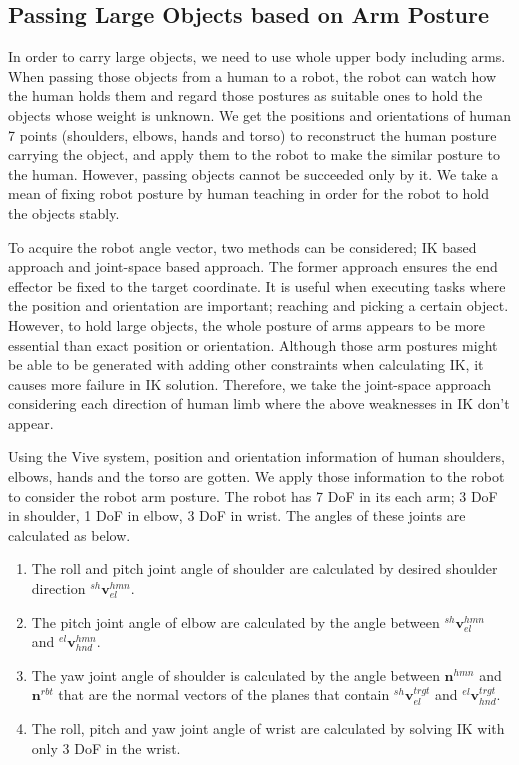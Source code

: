 \subsection{Passing Large Objects based on Arm Posture}
\label{subsec:hold}
In order to carry large objects, we need to use whole upper body including arms. When passing those objects from a human to a robot, the robot can watch how the human holds them and regard those postures as suitable ones to hold the objects whose weight is unknown. We get the positions and orientations of human 7 points (shoulders, elbows, hands and torso) to reconstruct the human posture carrying the object, and apply them to the robot to make the similar posture to the human. However, passing objects cannot be succeeded only by it. We take a mean of fixing robot posture by human teaching in order for the robot to hold the objects stably.\par
To acquire the robot angle vector, two methods can be considered; IK based approach and joint-space based approach. The former approach ensures the end effector be fixed to the target coordinate. It is useful when executing tasks where the position and orientation are important; reaching and picking a certain object. However, to hold large objects, the whole posture of arms appears to be more essential than exact position or orientation. Although those arm postures might be able to be generated with adding other constraints when calculating IK, it causes more failure in IK solution. Therefore, we take the joint-space approach considering each direction of human limb where the above weaknesses in IK don't appear.\par
Using the Vive system, position and orientation information of human shoulders, elbows, hands and the torso are gotten. We apply those information to the robot to consider the robot arm posture. %
The robot has 7 DoF in its each arm; 3 DoF in shoulder, 1 DoF in elbow, 3 DoF in wrist. The angles of these joints are calculated as below.
\begin{enumerate}
 \item The roll and pitch joint angle of shoulder are calculated by desired shoulder direction \(^{sh}\!\bm{v}^{hmn}_{el}\).
 \item The pitch joint angle of elbow are calculated by the angle between \(^{sh}\!\bm{v}^{hmn}_{el}\) and \(^{el}\!\bm{v}^{hmn}_{hnd}\).
 \item The yaw joint angle of shoulder is calculated by the angle between \(\bm{n}^{hmn}\) and \(\bm{n}^{rbt}\) that are the normal vectors of the planes that contain \(^{sh}\!\bm{v}^{trgt}_{el}\) and \(^{el}\!\bm{v}^{trgt}_{hnd}\).
 \item The roll, pitch and yaw joint angle of wrist are calculated by solving IK with only 3 DoF in the wrist.
\end{enumerate}

